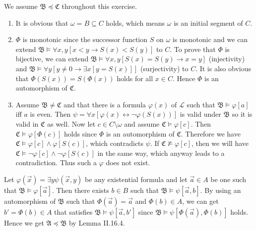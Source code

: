 \documentclass[12pt]{article}
\theoremstyle{definition}
\newenvironment{customthm}[1]
  {\renewcommand\theinnercustomthm{#1}\innercustomthm}
  {\endinnercustomthm}
\begin{document}
\begin{customthm}{II.16.8} We assume $\mathfrak{B}\preccurlyeq\mathfrak{C}$ throughout this exercise.
\begin{enumerate}
\item It is obvious that $\omega=B\subseteq C$ holds, which means $\omega$ is an initial segment of $C$.
\item $\Phi$ is monotonic since the successor function $S$ on $\omega$ is monotonic and we can extend $\mathfrak{B}\models\forall x,y[x<y\rightarrow S(x)<S(y)]$ to $C$. To prove that $\Phi$ is bijective, we can extend $\mathfrak{B}\models\forall x,y[S(x)=S(y)\rightarrow x=y]$ (injectivity) and $\mathfrak{B}\models\forall y[y\neq 0\rightarrow\exists x[y=S(x)]]$ (surjectivity) to $C$. It is also obvious that $\Phi(S(x))=S(\Phi(x))$ holds for all $x\in C$. Hence $\Phi$ is an automorphism of $\mathfrak{C}$.
\item Assume $\mathfrak{B}\neq\mathfrak{C}$ and that there is a formula $\varphi(x)$ of $\mathcal{L}$ such that $\mathfrak{B}\models\varphi[a]$ iff $a$ is even. Then  $\psi=\forall x[\varphi(x)\leftrightarrow\neg\varphi(S(x))]$ is valid under $\mathfrak{B}$ so it is valid in $\mathfrak{C}$ as well. Now let $c\in C\setminus\omega$ and assume $\mathfrak{C}\models\varphi[c]$. Then $\mathfrak{C}\models\varphi[\Phi(c)]$ holds since $\Phi$ is an automorphism of $\mathfrak{C}$. Therefore we have $\mathfrak{C}\models\varphi[c]\wedge\varphi[S(c)]$, which contradicts $\psi$. If $\mathfrak{C}\not\models\varphi[c]$, then we will have $\mathfrak{C}\models\neg\varphi[c]\wedge\neg\varphi[S(c)]$ in the same way, which anyway leads to a contradiction. Thus such a $\varphi$ does not exist.
\end{enumerate}
\end{customthm}

\begin{customthm}{II.16.9} Let $\varphi(\vec{x})=\exists y\psi(\vec{x},y)$ be any existential formula and let $\vec{a}\in A$ be one such that $\mathfrak{B}\models\varphi[\vec{a}]$. Then there exists $b\in B$ such that $\mathfrak{B}\models\psi[\vec{a},b]$. By using an automorphism of $\mathfrak{B}$ such that $\Phi(\vec{a})=\vec{a}$ and $\Phi(b)\in A$, we can get $b'=\Phi(b)\in A$ that satisfies $\mathfrak{B}\models\psi[\vec{a},b']$ since $\mathfrak{B}\models\psi[\Phi(\vec{a}),\Phi(b)]$ holds. Hence we get $\mathfrak{A}\preccurlyeq\mathfrak{B}$ by Lemma II.16.4.
\end{customthm}
\end{document}
